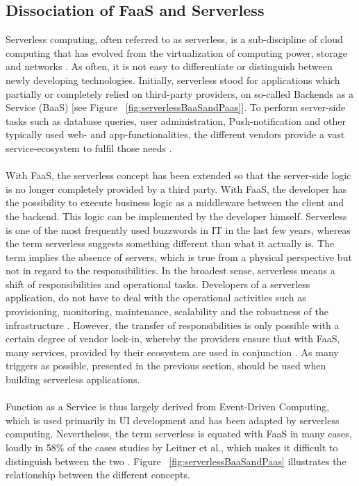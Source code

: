 \documentclass[a4paper,twoside,11pt, pagesize]{scrartcl}
\begin{document}
\begin{spacing}{1.2}
\subsection{Dissociation of FaaS and Serverless}
Serverless computing, often referred to as serverless, is a sub-discipline of cloud computing that has evolved from the virtualization of computing power, storage and networks \cite{jackson2018investigation}. As often, it is not easy to differentiate or distinguish between newly developing technologies. Initially, serverless stood for applications which partially or completely relied on third-party providers, on so-called Backends as a Service (BaaS) [see Figure ~\ref{fig:serverlessBaaSandPaas}]. To perform server-side tasks such as database queries, user administration, Push-notification and other typically used web- and app-functionalities, the different vendors provide a vast service-ecosystem to fulfil those needs \cite{fowler2018serverless}.\\\\ With FaaS, the serverless concept has been extended so that the server-side logic is no longer completely provided by a third party. With FaaS, the developer has the possibility to execute business logic as a middleware between the client and the backend. This logic can be implemented by the developer himself. Serverless is one of the most frequently used buzzwords in IT in the last few years, whereas the term \glqq serverless\grqq{} suggests something different than what it actually is. The term implies the absence of servers, which is true from a physical perspective but not in regard to the responsibilities. In the broadest sense, serverless means a shift of responsibilities and operational tasks. Developers of a serverless application, do not have to deal with the operational activities such as provisioning, monitoring, maintenance, scalability and the robustness of the infrastructure \cite{baldini2017serverless}. However, the transfer of responsibilities is only possible with a certain degree of vendor lock-in, whereby the providers ensure that with FaaS, many services, provided by their ecosystem are used in conjunction \cite{kritikos2018review}. As many triggers as possible, presented in the previous section, should be used when building serverless applications.\\\\ Function as a Service is thus largely derived from Event-Driven Computing, which is used primarily in UI development and has been adapted by serverless computing. Nevertheless, the term serverless is equated with FaaS in many cases, loudly in 58\% of the cases studies by Leitner et al., which makes it difficult to distinguish between the two \cite{leitner2019mixed}. Figure ~\ref{fig:serverlessBaaSandPaas} illustrates the relationship between the different concepts.

\end{spacing}
\end{document}
